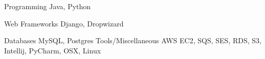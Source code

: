 

\begin{cvskills}

  \cvskill
    {Programming} %
    {Java, Python} %

  \cvskill
    {Web Frameworks} %
    {Django, Dropwizard} %

  \cvskill
    {Databases} %
    {MySQL, Postgres} %
  \cvskill
    {Tools/Miscellaneous} %
    {AWS EC2, SQS, SES, RDS, S3, Intellij, PyCharm, OSX, Linux} %

\end{cvskills}
